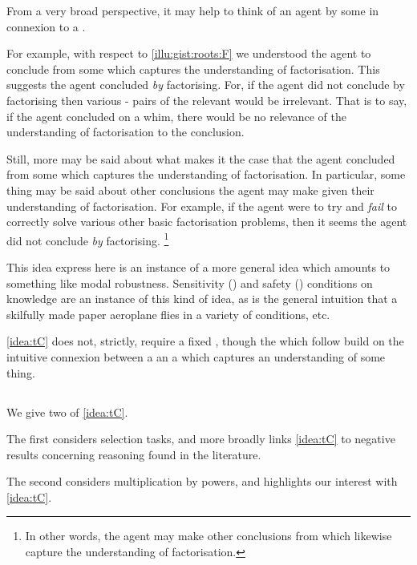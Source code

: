 \begin{note}
  From a very broad perspective, it may help to think of an agent by some \torN{} in connexion to a \pool{}.

  For example, with respect to \autoref{illu:gist:roots:F} we understood the agent to conclude  from some \pool{} which captures the \agents{} understanding of factorisation.
  This suggests the agent concluded  \emph{by} factorising.
  For, if the agent did not conclude  by factorising then various - pairs of the relevant \pool{} would be irrelevant.
  That is to say, if the agent concluded  on a whim, there would be no relevance of the \agents{} understanding of factorisation to the conclusion.

  Still, more may be said about what makes it the case that the agent concluded  from some \pool{} which captures the \agents{} understanding of factorisation.
  In particular, some thing may be said about other conclusions the agent may make given their understanding of factorisation.
  For example, if the agent were to try and \emph{fail} to correctly solve various other basic factorisation problems, then it seems the agent did not conclude  \emph{by} factorising.%
  \footnote{
    In other words, the agent may make other conclusions from  which likewise capture the \agents{} understanding of factorisation.
  }

  This idea express here is an instance of a more general idea which amounts to something like modal robustness.
  Sensitivity (\cite{Nozick:1981aa}) and safety (\cite{Sosa:1999aa}) conditions on knowledge are an instance of this kind of idea, as is the general intuition that a skilfully made paper aeroplane flies in a variety of conditions, etc.

  \autoref{idea:tC} does not, strictly, require a fixed \pool{}, though the  which follow build on the intuitive connexion between a \torN{} an a \pool{} which captures an \agents{} understanding of some thing.
\end{note}


\subsection{}
\label{sec:illu3-1}

\begin{note}
  We give two  of \autoref{idea:tC}.

  The first  considers selection tasks, and more broadly links \autoref{idea:tC} to negative results concerning reasoning found in the literature.

  The second  considers multiplication by powers, and highlights our interest with \autoref{idea:tC}.
\end{note}



